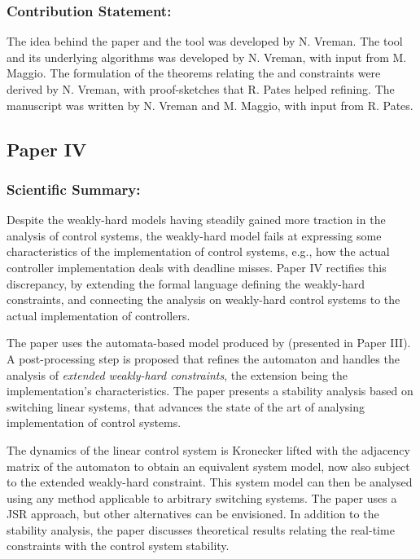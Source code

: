 \subsubsection*{Contribution Statement:}%
%
The idea behind the paper and the tool was developed by N. Vreman. 
The tool and its underlying algorithms was developed by N. Vreman, with input from M. Maggio.
The formulation of the theorems relating the \tAH{} and \tRH{} constraints were derived by N. Vreman, with proof-sketches that R. Pates helped refining.
The manuscript was written by N. Vreman and M. Maggio, with input from R. Pates.


\subsection*{Paper IV}%
%
\begin{quote}
\end{quote}

\subsubsection*{Scientific Summary:}%
%
Despite the weakly-hard models having steadily gained more traction in the analysis of control systems, the weakly-hard model fails at expressing some characteristics of the implementation of control systems, e.g., how the actual controller implementation deals with deadline misses.
Paper IV rectifies this discrepancy, by extending the formal language defining the weakly-hard constraints, and connecting the analysis on weakly-hard control systems to the actual implementation of controllers.

The paper uses the automata-based model produced by \tool{} (presented in Paper III).
A post-processing step is proposed that refines the automaton and handles the analysis of \emph{extended weakly-hard constraints}, the extension being the implementation's characteristics.
The paper presents a stability analysis based on switching linear systems, that advances the state of the art of analysing implementation of control systems.

The dynamics of the linear control system is Kronecker lifted with the adjacency matrix of the automaton to obtain an equivalent system model, now also subject to the extended weakly-hard constraint.
This system model can then be analysed using any method applicable to arbitrary switching systems.
The paper uses a JSR approach, but other alternatives can be envisioned.
In addition to the stability analysis, the paper discusses theoretical results relating the real-time constraints with the control system stability.

